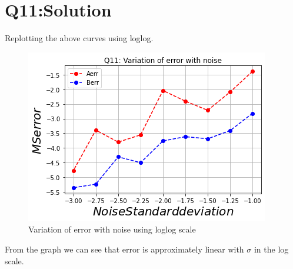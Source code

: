 \documentclass[11pt, a4paper]{article}
\begin{document}
\section*{Q11:Solution}
Replotting the above curves using loglog.
\begin{figure}[!tbh]
  \centering
  \includegraphics[scale=0.5]{Q11plot.png}  
  \caption{Variation of error with noise using loglog scale}
\end{figure}

From the graph we can see that error is approximately linear with $\sigma$ in the log scale.
\end{document}
